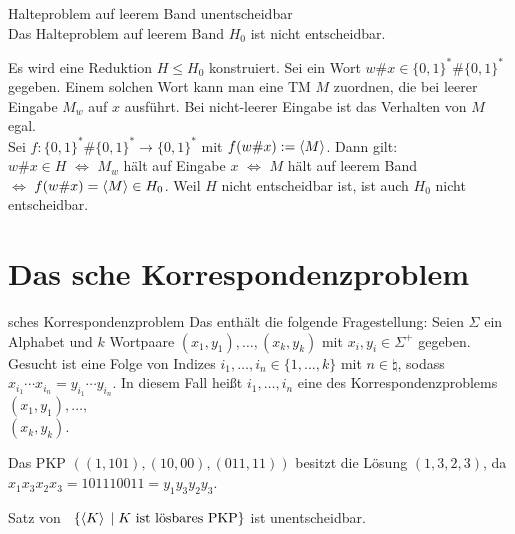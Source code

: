 \begin{Satz}{Halteproblem auf leerem Band unentscheidbar}\\
    Das Halteproblem auf leerem Band $H_0$ ist nicht entscheidbar.
\end{Satz}

\begin{Beweis}
    Es wird eine Reduktion $H \le H_0$ konstruiert.
    Sei ein Wort $w\# x \in \{0, 1\}^\ast \# \{0, 1\}^\ast$ gegeben.
    Einem solchen Wort kann man eine TM $M$ zuordnen,
    die bei leerer Eingabe $M_w$ auf $x$ ausführt.
    Bei nicht-leerer Eingabe ist das Verhalten von $M$ egal.\\
    Sei $f\colon \{0, 1\}^\ast \# \{0, 1\}^\ast \rightarrow \{0, 1\}^\ast$ mit
    $f(w\# x) := \left\langle M\right\rangle$.
    Dann gilt:\\
    $w\# x \in H$ $\iff$
    $M_w$ hält auf Eingabe $x$ $\iff$
    $M$ hält auf leerem Band\\
    $\iff$
    $f(w\# x) = \left\langle M\right\rangle \in H_0$.
    Weil $H$ nicht entscheidbar ist, ist auch $H_0$ nicht entscheidbar.
\end{Beweis}

\pagebreak

\section{%
    Das sche Korrespondenzproblem%
}

\begin{Def}{sches Korrespondenzproblem}
    Das  enthält die folgende Fragestellung:
    Seien $\Sigma$ ein Alphabet und $k$ Wortpaare $(x_1, y_1), \dotsc, (x_k, y_k)$ mit
    $x_i, y_i \in \Sigma^+$ gegeben.
    Gesucht ist eine Folge von Indizes $i_1, \dotsc, i_n \in \{1, \dotsc, k\}$ mit
    $n \in \natural$, sodass $x_{i_1} \dotsb x_{i_n} = y_{i_1} \dotsb y_{i_n}$.
    In diesem Fall heißt $i_1, \dotsc, i_n$ eine  des Korrespondenzproblems
    $(x_1, y_1), \dotsc,$\\
    $(x_k, y_k)$.
\end{Def}

\begin{Bsp}
    Das PKP $((1, 101), (10, 00), (011, 11))$ besitzt die Lösung
    $(1, 3, 2, 3)$, da $x_1 x_3 x_2 x_3 = 101110011 = y_1 y_3 y_2 y_3$.
\end{Bsp}

\begin{Satz}{Satz von \upshape\,\!}
    $\{\left\langle K\right\rangle \;|\; K \text{ ist lösbares PKP}\}$ ist unentscheidbar.
\end{Satz}


